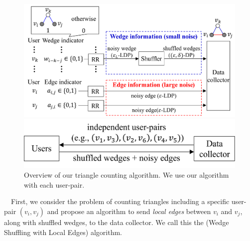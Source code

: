 \begin{figure}[t]
  \centering
  \includegraphics[width=0.99\linewidth]{fig/local_edges.pdf}
  \vspace{-2mm}
  \caption{Overview of our \AlgWSLE{} (Wedge Shuffling with Local Edges) algorithm with inputs $v_i$ and $v_j$. 
  }
  \label{fig:local_edges}
\vspace{2mm}
  \centering
  \includegraphics[width=0.7\linewidth]{fig/sampling_pairs.pdf}
  \vspace{-2mm}
  \caption{Overview of our triangle counting algorithm. 
  We use our 
  \AlgWSLE{} 
  algorithm with each user-pair.
  }
  \label{fig:triangle_count}
\end{figure}

\smallskip
{}~~First, we consider the problem of counting triangles including a specific user-pair $(v_i, v_j)$ and propose an algorithm to send 
\textit{local edges} between $v_i$ and $v_j$, along with shuffled wedges, to the data collector. 
We call this the \AlgWSLE{} (Wedge Shuffling with Local Edges) algorithm. 

